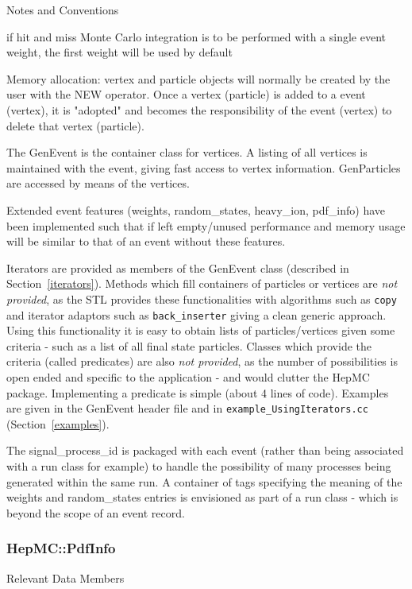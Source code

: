\documentclass[11pt,letterpaper]{article}
\begin{document}
\begin{myitemize}{Notes and Conventions}
  \item if hit and miss Monte Carlo integration is to be performed
    with a single event weight, the first weight will be used by default
  \item Memory allocation: vertex and particle objects will normally
    be created by the user with the NEW operator. Once a vertex
    (particle) is added to a event (vertex), it is "adopted" and
    becomes the responsibility of the event (vertex) to delete that
    vertex (particle).
\end{myitemize}

The GenEvent is the container class for vertices. 
A listing of all vertices is maintained with the event, giving fast
access to vertex information. GenParticles are accessed by means of the
vertices.

Extended event features (weights, random\_states, heavy\_ion, pdf\_info) 
have been implemented such that if left empty/unused performance and memory
usage will be similar to that of an event without these features.

Iterators are provided as members of the GenEvent class
(described in Section~\ref{iterators}). Methods which fill containers of
particles or vertices are {\it not provided}, as the STL provides these
functionalities with algorithms such as \verb!copy! and iterator adaptors
such as \verb!back_inserter! giving a clean generic approach.
Using this functionality it is easy to obtain lists of
particles/vertices given some criteria - such as a list of all final
state particles. Classes which provide the criteria (called
predicates) are also {\it not provided}, as the number of
possibilities is open ended and specific to the application -
and would clutter the HepMC package. Implementing a predicate is
simple (about 4 lines of code).
Examples are given in the GenEvent header file and in
\verb!example_UsingIterators.cc! (Section~\ref{examples}).

The signal\_process\_id is packaged with each event (rather than being
associated with a run class for example) to handle the possibility of
many processes being generated within the same run. A container of
tags specifying the meaning of the weights and random\_states entries
is envisioned as part of a run class - which is beyond the scope of an
event record.

%
%

\subsubsection{HepMC::PdfInfo}
\begin{myitemize}{Relevant Data Members}
\end{myitemize}
\end{document}

